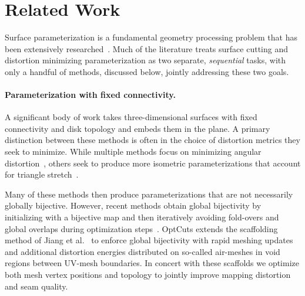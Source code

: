 
\section{Related Work}
\label{sec:related}
Surface parameterization is a fundamental geometry processing problem that has been extensively researched~\cite{Sheffer07_ParameterizationSurvey,Hormann2008}.
Much of the literature treats surface cutting and distortion minimizing parameterization as two separate, \emph{sequential} tasks, with only a handful of methods, discussed below, jointly addressing these two goals.

\paragraph{Parameterization with fixed connectivity.}
A significant body of work takes three-dimensional surfaces with fixed connectivity and disk topology and embeds them in the plane. A primary distinction between these methods is often in the choice of distortion metrics they seek to minimize.  While multiple methods focus on minimizing angular distortion~\cite{Floater2003,Sheffer2005ABFPP,Levy2002,Aigerman2015,Sawhney:2017}, others seek to produce more isometric parameterizations that account for triangle stretch~\cite{Sander2001Texture,Hormann2000MIPS,Rabinovich2017,Zhu2017BCQN,Shtengel:GOvCM:2017,claici2017isometry}. 

Many of these methods then produce parameterizations that are not necessarily globally bijective. However, recent methods obtain global bijectivity by initializing with a bijective map and then iteratively avoiding fold-overs and global overlaps during optimization steps~\cite{Smith2015Bijective,Jiang2017Simplicial}.
%
OptCuts extends the scaffolding method of Jiang et al.\  to enforce global bijectivity with rapid meshing updates and additional distortion energies distributed on so-called air-meshes in void regions between UV-mesh boundaries. In concert with these scaffolds we optimize both mesh vertex positions and topology to jointly improve mapping distortion and seam quality.
%

